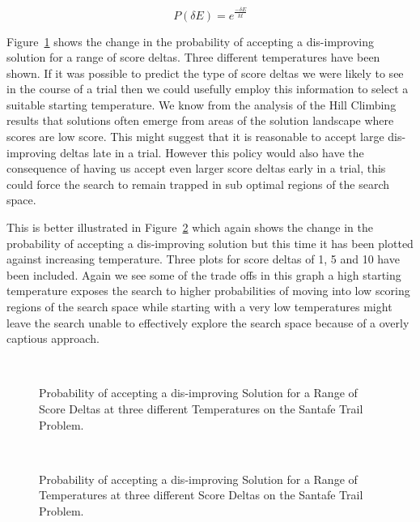 \large
\begin{displaymath}
P(\delta E) = e ^{ \frac{-\delta E}{kt}}
\end{displaymath}
\normalsize

Figure~\ref{santafe_accept_prob_score_delta} shows the change in the probability of accepting a dis-improving solution for a range of score deltas. Three different temperatures have been shown. If it was possible to predict the type of score deltas we were likely to see in the course of a trial then we could usefully employ this information to select a suitable starting temperature. We know from the analysis of the Hill Climbing results that solutions often emerge from areas of the solution landscape where scores are low score. This might suggest that it is reasonable to accept large dis-improving deltas late in a trial. However this policy would also have the consequence of having us accept even larger score deltas early in a trial, this could force the search to remain trapped in sub optimal regions of the search space.

This is better illustrated in Figure~\ref{santafe_accept_prob_score_temp} which again shows the change in the probability of accepting a dis-improving solution but this time it has been plotted against increasing temperature. Three plots for score deltas of 1, 5 and 10 have been included. Again we see some of the trade offs in this graph a high starting temperature exposes the search to higher probabilities of moving into low scoring regions of the search space while starting with a very low temperatures might leave the search unable to effectively explore the search space because of a overly captious approach.


\begin{figure}[]
\centerline{\hbox{
}}
\caption[Probability of accepting a dis-improving Solution for a Range of Score Deltas]{Probability of accepting a dis-improving Solution for a Range of Score Deltas at three different Temperatures on the Santafe Trail Problem.}
\label{santafe_accept_prob_score_delta}
\end{figure}


\begin{figure}[]
\centerline{\hbox{
}}
\caption[Probability of accepting a dis-improving Solution for a Range of Temperatures]{Probability of accepting a dis-improving Solution for a Range of Temperatures at three different Score Deltas on the Santafe Trail Problem.}
\label{santafe_accept_prob_score_temp}
\end{figure}

